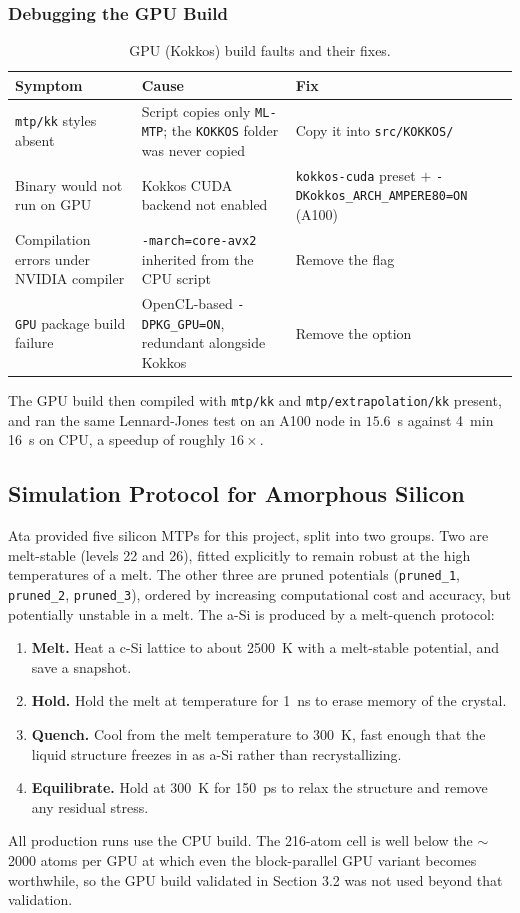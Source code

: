 \documentclass{article}
\begin{document}
\subsubsection{Debugging the GPU Build}

\begin{table}[H]
\centering
\small
\begin{tabular}{p{}|p{}|p{}}
\toprule
Symptom & Cause & Fix \\
\midrule
\texttt{mtp/kk} styles absent & Script copies only \texttt{ML-MTP}; the \texttt{KOKKOS} folder was never copied & Copy it into \texttt{src/KOKKOS/} \\
\hline
Binary would not run on GPU & Kokkos CUDA backend not enabled & \texttt{kokkos-cuda} preset $+$ \texttt{-DKokkos\_ARCH\_AMPERE80=ON} (A100) \\
\hline
Compilation errors under NVIDIA compiler & \texttt{-march=core-avx2} inherited from the CPU script & Remove the flag \\
\hline
\texttt{GPU} package build failure & OpenCL-based \texttt{-DPKG\_GPU=ON}, redundant alongside Kokkos & Remove the option \\
\bottomrule
\end{tabular}
\caption{GPU (Kokkos) build faults and their fixes.}
\label{tab:buildfaults-gpu}
\end{table}

The GPU build then compiled with \texttt{mtp/kk} and \texttt{mtp/extrapolation/kk} present, and ran the same Lennard-Jones test on an A100 node in $15.6$~s against 4~min 16~s on CPU, a speedup of roughly $16\times$.

\subsection{Simulation Protocol for Amorphous Silicon}
Ata provided five silicon MTPs for this project, split into two groups. Two are melt-stable (levels 22 and 26), fitted explicitly to remain robust at the high temperatures of a melt. The other three are pruned potentials (\texttt{pruned\_1}, \texttt{pruned\_2}, \texttt{pruned\_3}), ordered by increasing computational cost and accuracy, but potentially unstable in a melt. The a-Si is produced by a melt-quench protocol:
\begin{enumerate}
    \item \textbf{Melt.} Heat a c-Si lattice to about 2500~K with a melt-stable potential, and save a snapshot.
    \item \textbf{Hold.} Hold the melt at temperature for 1~ns to erase memory of the crystal.
    \item \textbf{Quench.} Cool from the melt temperature to 300~K, fast enough that the liquid structure freezes in as a-Si rather than recrystallizing.
    \item \textbf{Equilibrate.} Hold at 300~K for 150~ps to relax the structure and remove any residual stress.
\end{enumerate}
All production runs use the CPU build. The 216-atom cell is well below the $\sim$2000 atoms per GPU at which even the block-parallel GPU variant becomes worthwhile, so the GPU build validated in Section 3.2 was not used beyond that validation.
\end{document}
